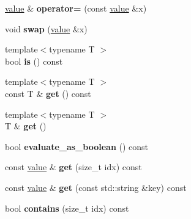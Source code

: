 \begin{DoxyCompactItemize}
\item 
\hypertarget{classpicojson_1_1value_acc5e4506e6a793af5132983573f9da6a}{\hyperlink{classpicojson_1_1value}{value} \& {\bfseries operator=} (const \hyperlink{classpicojson_1_1value}{value} \&x)}\label{classpicojson_1_1value_acc5e4506e6a793af5132983573f9da6a}

\item 
\hypertarget{classpicojson_1_1value_a6e3ac589ed811603ef9dadc6f91c737d}{void {\bfseries swap} (\hyperlink{classpicojson_1_1value}{value} \&x)}\label{classpicojson_1_1value_a6e3ac589ed811603ef9dadc6f91c737d}

\item 
\hypertarget{classpicojson_1_1value_ab67330d0c135a7c0fe689ef2294bda40}{{\footnotesize template$<$typename T $>$ }\\bool {\bfseries is} () const }\label{classpicojson_1_1value_ab67330d0c135a7c0fe689ef2294bda40}

\item 
\hypertarget{classpicojson_1_1value_a1b6f107770f2ae6fa9b4939313b0a917}{{\footnotesize template$<$typename T $>$ }\\const T \& {\bfseries get} () const }\label{classpicojson_1_1value_a1b6f107770f2ae6fa9b4939313b0a917}

\item 
\hypertarget{classpicojson_1_1value_a94f71153b3d14df524397a5cafcef2fc}{{\footnotesize template$<$typename T $>$ }\\T \& {\bfseries get} ()}\label{classpicojson_1_1value_a94f71153b3d14df524397a5cafcef2fc}

\item 
\hypertarget{classpicojson_1_1value_afa68a0efe890e7ab4a26cd7e3f842eb5}{bool {\bfseries evaluate\+\_\+as\+\_\+boolean} () const }\label{classpicojson_1_1value_afa68a0efe890e7ab4a26cd7e3f842eb5}

\item 
\hypertarget{classpicojson_1_1value_a93d61431aeb912ba605e20c2cd2a0d97}{const \hyperlink{classpicojson_1_1value}{value} \& {\bfseries get} (size\+\_\+t idx) const }\label{classpicojson_1_1value_a93d61431aeb912ba605e20c2cd2a0d97}

\item 
\hypertarget{classpicojson_1_1value_a703fb6a50c2e8eec30fdf6b03eec1493}{const \hyperlink{classpicojson_1_1value}{value} \& {\bfseries get} (const std\+::string \&key) const }\label{classpicojson_1_1value_a703fb6a50c2e8eec30fdf6b03eec1493}

\item 
\hypertarget{classpicojson_1_1value_a60efde50d8b780998ea663b0239c6c46}{bool {\bfseries contains} (size\+\_\+t idx) const }\label{classpicojson_1_1value_a60efde50d8b780998ea663b0239c6c46}


\end{DoxyCompactItemize}
